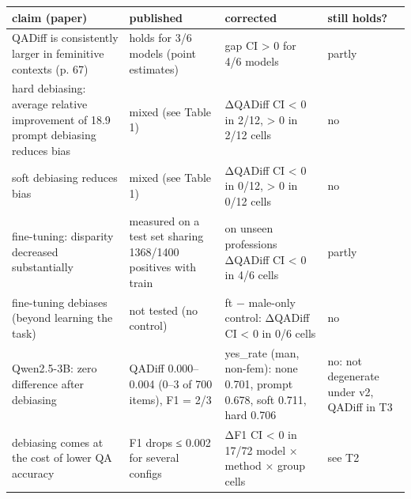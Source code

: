 \begin{tabular}{llll}
\toprule
claim (paper) & published & corrected & still holds? \\
\midrule
QADiff is consistently larger in feminitive contexts (p. 67) & holds for 3/6 models (point estimates) & gap CI > 0 for 4/6 models & partly \\
hard debiasing: average relative improvement of 18.9%
prompt debiasing reduces bias & mixed (see Table 1) & ΔQADiff CI < 0 in 2/12, > 0 in 2/12 cells & no \\
soft debiasing reduces bias & mixed (see Table 1) & ΔQADiff CI < 0 in 0/12, > 0 in 0/12 cells & no \\
fine-tuning: disparity decreased substantially & measured on a test set sharing 1368/1400 positives with train & on unseen professions ΔQADiff CI < 0 in 4/6 cells & partly \\
fine-tuning debiases (beyond learning the task) & not tested (no control) & ft − male-only control: ΔQADiff CI < 0 in 0/6 cells & no \\
Qwen2.5-3B: zero difference after debiasing & QADiff 0.000–0.004 (0–3 of 700 items), F1 = 2/3 & yes_rate (man, non-fem): none 0.701, prompt 0.678, soft 0.711, hard 0.706 & no: not degenerate under v2, QADiff in T3 \\
debiasing comes at the cost of lower QA accuracy & F1 drops ≤ 0.002 for several configs & ΔF1 CI < 0 in 17/72 model × method × group cells & see T2 \\
\bottomrule
\end{tabular}
